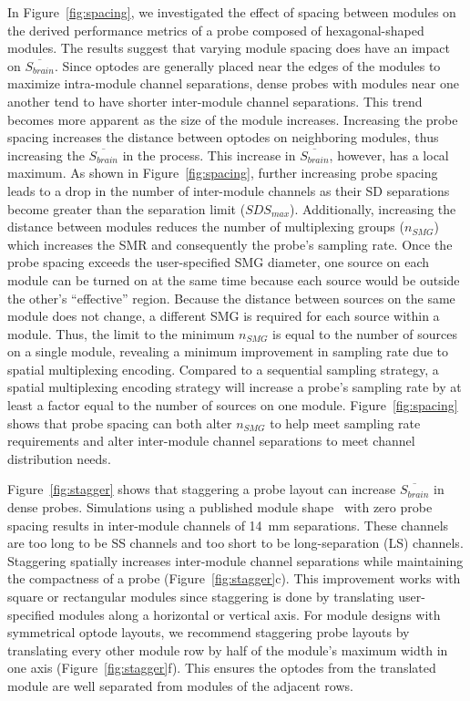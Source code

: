 In Figure~\ref{fig:spacing}, we investigated the effect of spacing between modules on the derived performance metrics of a probe composed of hexagonal-shaped modules. The results suggest that varying module spacing does have an impact on $\overline{S_{brain}}$. Since optodes are generally placed near the edges of the modules to maximize intra-module channel separations, dense probes with modules near one another tend to have shorter inter-module channel separations. This trend becomes more apparent as the size of the module increases. Increasing the probe spacing increases the distance between optodes on neighboring modules, thus increasing the $\overline{S_{brain}}$ in the process. This increase in $\overline{S_{brain}}$, however, has a local maximum. As shown in Figure~\ref{fig:spacing}, further increasing probe spacing leads to a drop in the number of inter-module channels as their \ac{SD} separations become greater than the separation limit ($SDS_{max}$). Additionally, increasing the distance between modules reduces the number of multiplexing groups ($n_{SMG}$) which increases the \ac{SMR} and consequently the probe's sampling rate. Once the probe spacing exceeds the user-specified \ac{SMG} diameter, one source on each module can be turned on at the same time because each source would be outside the other's ``effective'' region. Because the distance between sources on the same module does not change, a different \ac{SMG} is required for each source within a module. Thus, the limit to the minimum $n_{SMG}$ is equal to the number of sources on a single module, revealing a minimum improvement in sampling rate due to spatial multiplexing encoding. Compared to a sequential sampling strategy, a spatial multiplexing encoding strategy will increase a probe's sampling rate by at least a factor equal to the number of sources on one module. Figure~\ref{fig:spacing} shows that probe spacing can both alter $n_{SMG}$ to help meet sampling rate requirements and alter inter-module channel separations to meet channel distribution needs.

Figure~\ref{fig:stagger} shows that staggering a probe layout can increase $\overline{S_{brain}}$ in dense probes. Simulations using a published module shape~\cite{Bci2017} with zero probe spacing results in inter-module channels of 14~mm separations. These channels are too long to be \ac{SS} channels and too short to be long-separation (LS) channels. Staggering spatially increases inter-module channel separations while maintaining the compactness of a probe (Figure~\ref{fig:stagger}c). This improvement works with square or rectangular modules since staggering is done by translating user-specified modules along a horizontal or vertical axis. For module designs with symmetrical optode layouts, we recommend staggering probe layouts by translating every other module row by half of the module's maximum width in one axis (Figure~\ref{fig:stagger}f). This ensures the optodes from the translated module are well separated from modules of the adjacent rows.


